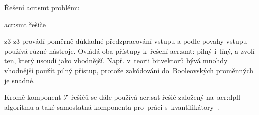\documentclass[thesis=M,czech]{FITthesis}[2012/06/26]
\newcommand{\acrlabel}[1]{acr:#1}
\newcommand{\acr}[1]{\acrshort{\acrlabel{#1}}}
\newcommand{\cit}[1]{\cite{#1}}
\newcommand{\set}[1]{\ensuremath{\mathcal{#1}}}
\begin{document}
\begin{section}{Řešení \acr{smt} problému}
\begin{subsection}{\acr{smt} řešiče}
\begin{paragraph}{z3}
z3 provádí poměrně důkladné předzpracování vstupu
a podle povahy vstupu používá různé nástroje.
Ovládá oba přístupy k~řešení
\acr{smt}: pilný i~líný,
a zvolí ten, který usoudí jako vhodnější.
Např. v~teorii bitvektorů bývá mnohdy
vhodnější použít pilný přístup,
protože zakódování do~Booleovských proměnných je snadné.

Kromě komponent \set{T}-řešičů
se dále používá \acr{sat} řešič
založený na~\acr{dpll} algoritmu
a také samostatná komponenta
pro~práci s~kvantifikátory~\cit{z3-art}.
\end{paragraph} %


\end{subsection} %


\end{section} %

\end{document}
